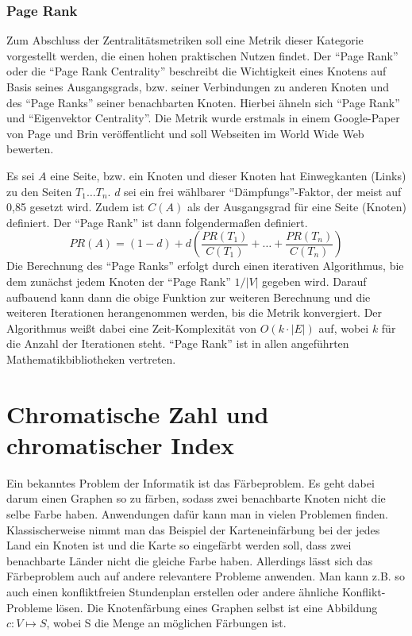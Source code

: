 \documentclass[a4paper,12pt,ngerman,chapterprefix=false,listof=totoc,bibliography=totoc]{scrreprt}
\begin{document}
\subsubsection*{Page Rank}
{
Zum Abschluss der Zentralitätsmetriken soll eine Metrik dieser Kategorie vorgestellt werden, die einen hohen praktischen Nutzen findet. Der "`Page Rank"' oder die "`Page Rank Centrality"' beschreibt die Wichtigkeit eines Knotens auf Basis seines Ausgangsgrads, bzw. seiner Verbindungen zu anderen Knoten und des "`Page Ranks"' seiner benachbarten Knoten. Hierbei ähneln sich "`Page Rank"' und "`Eigenvektor Centrality"'. Die Metrik wurde erstmals in einem Google-Paper von Page und Brin veröffentlicht und soll Webseiten im World Wide Web bewerten. \cite{brin_anatomy_1998}

Es sei \(A\) eine Seite, bzw. ein Knoten und dieser Knoten hat Einwegkanten (Links) zu den Seiten \(T_1\dots T_n\). \(d\) sei ein frei wählbarer "`Dämpfungs"'-Faktor, der meist auf 0,85 gesetzt wird. Zudem ist \(C(A)\) als der Ausgangsgrad für eine Seite (Knoten) definiert. Der "`Page Rank"' ist dann folgendermaßen definiert.
\[
	PR(A) = (1-d)+d(\frac{PR(T_1)}{C(T_1)}+\dots +\frac{PR(T_n)}{C(T_n)})
\]
Die Berechnung des "`Page Ranks"' erfolgt durch einen iterativen Algorithmus, bie dem zunächst jedem Knoten der "`Page Rank"' \(1/|V|\) gegeben wird. Darauf aufbauend kann dann die obige Funktion zur weiteren Berechnung und die weiteren Iterationen herangenommen werden, bis die Metrik konvergiert. Der Algorithmus weißt dabei eine Zeit-Komplexität von \(O(k\cdot |E|)\) auf, wobei \(k\) für die Anzahl der Iterationen steht. \cite{oracle_pagerank_2017} "`Page Rank"' ist in allen angeführten Mathematikbibliotheken vertreten. \cite{sagemath_generic_nodate,wolfram_graph_2020,matlab_measure_2020}
}
\section{Chromatische Zahl und chromatischer Index}
{
Ein bekanntes Problem der Informatik ist das Färbeproblem. Es geht dabei darum einen Graphen so zu färben, sodass zwei benachbarte Knoten nicht die selbe Farbe haben. Anwendungen dafür kann man in vielen Problemen finden. Klassischerweise nimmt man das Beispiel der Karteneinfärbung bei der jedes Land ein Knoten ist und die Karte so eingefärbt werden soll, dass zwei benachbarte Länder nicht die gleiche Farbe haben. Allerdings lässt sich das Färbeproblem auch auf andere relevantere Probleme anwenden. Man kann z.B. so auch einen konfliktfreien Stundenplan erstellen oder andere ähnliche Konflikt-Probleme lösen. Die Knotenfärbung eines Graphen selbst ist eine Abbildung \(c: V\mapsto S\), wobei S die Menge an möglichen Färbungen ist. \cite{diestel_graphentheorie_2000,aigner_graphentheorie_2015} 
}
\end{document}
